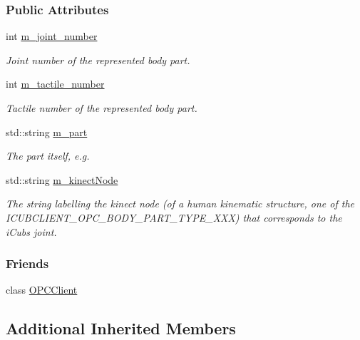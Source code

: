 \subsubsection*{Public Attributes}
\begin{DoxyCompactItemize}
\item 
int \hyperlink{group__icubclient__representations_ac6d24ba7230a01a4b19e53853f86f24d}{m\+\_\+joint\+\_\+number}
\begin{DoxyCompactList}\small\item\em Joint number of the represented body part. \end{DoxyCompactList}\item 
int \hyperlink{group__icubclient__representations_a2551839d7a05aad0ed6cb5c4bca69b7a}{m\+\_\+tactile\+\_\+number}
\begin{DoxyCompactList}\small\item\em Tactile number of the represented body part. \end{DoxyCompactList}\item 
std\+::string \hyperlink{group__icubclient__representations_a96200fe4105f64e2b1c5ea1387b951e6}{m\+\_\+part}
\begin{DoxyCompactList}\small\item\em The part itself, e.\+g. \end{DoxyCompactList}\item 
std\+::string \hyperlink{group__icubclient__representations_a90e8e2887be1b576e2151cf32807d0f4}{m\+\_\+kinect\+Node}
\begin{DoxyCompactList}\small\item\em The string labelling the kinect node (of a human kinematic structure, one of the I\+C\+U\+B\+C\+L\+I\+E\+N\+T\+\_\+\+O\+P\+C\+\_\+\+B\+O\+D\+Y\+\_\+\+P\+A\+R\+T\+\_\+\+T\+Y\+P\+E\+\_\+\+X\+XX) that corresponds to the i\+Cub\textquotesingle{}s joint. \end{DoxyCompactList}\end{DoxyCompactItemize}
\subsubsection*{Friends}
\begin{DoxyCompactItemize}
\item 
class \hyperlink{group__icubclient__representations_a80f0caa9925206967111a3d2713874a2}{O\+P\+C\+Client}
\end{DoxyCompactItemize}
\subsection*{Additional Inherited Members}


